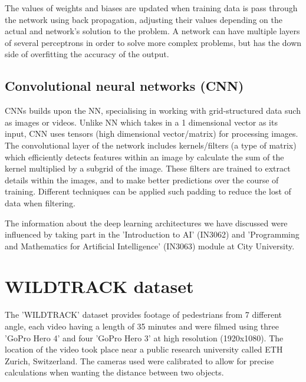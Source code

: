 \documentclass[12pt]{report}
\begin{document}
\vspace{5 mm}

The values of weights and biases are updated when training data is pass through the network using back propagation, adjusting their values depending on the actual and network's solution to the problem. A network can have multiple layers of several perceptrons in order to solve more complex problems, but has the down side of overfitting the accuracy of the output.


\subsection{Convolutional neural networks (CNN)}

CNNs builds upon the NN, specialising in working with grid-structured data such as images or videos. Unlike NN which takes in a 1 dimensional vector as its input, CNN uses tensors (high dimensional vector/matrix) for processing images. The convolutional layer of the network includes kernels/filters (a type of matrix) which efficiently detects features within an image by calculate the sum of the kernel multiplied by a subgrid of the image. These filters are trained to extract details within the images, and to make better predictions over the course of training. Different techniques can be applied such padding to reduce the lost of data when filtering.

\vspace{2mm}

The information about the deep learning architectures we have discussed were influenced by taking part in the 'Introduction to AI' (IN3062) and 'Programming and Mathematics for Artificial Intelligence' (IN3063) module at City University.

\section{WILDTRACK dataset}

The 'WILDTRACK' dataset provides footage of pedestrians from 7 different angle, each video having a length of 35 minutes and were filmed using three 'GoPro Hero 4' and four 'GoPro Hero 3' at high resolution (1920x1080). The location of the video took place near a public research university called ETH Zurich, Switzerland. The cameras used were calibrated to allow for precise calculations when wanting the distance between two objects.

\vspace{2mm}
\end{document}
